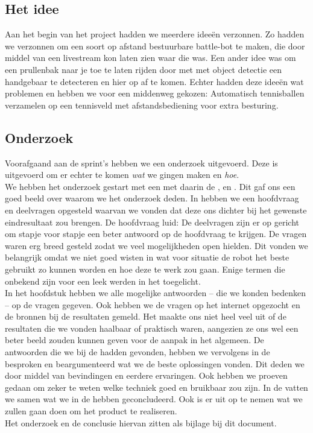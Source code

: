 \subsection{Het idee}
Aan het begin van het project hadden we meerdere ideeën verzonnen. Zo hadden we verzonnen om een soort op afstand bestuurbare battle-bot te maken, die door middel van een livestream kon laten zien waar die was. Een ander idee was om een prullenbak naar je toe te laten rijden door met met object detectie een handgebaar te detecteren en hier op af te komen. Echter hadden deze ideeën wat problemen en hebben we voor een middenweg gekozen: Automatisch tennisballen verzamelen op een tennisveld met afstandsbediening voor extra besturing.

\subsection{Onderzoek}
Voorafgaand aan de sprint's hebben we een onderzoek uitgevoerd. Deze is uitgevoerd om er echter te komen \textit{wat} we gingen maken en \textit{hoe}. \\

We hebben het onderzoek gestart met een  met daarin de ,  en . Dit gaf ons een goed beeld over waarom we het onderzoek deden. In  hebben we een hoofdvraag en deelvragen opgesteld waarvan we vonden dat deze ons dichter bij het gewenste eindresultaat zou brengen. De hoofdvraag luid: \textit{} De deelvragen zijn er op gericht om stapje voor stapje een beter antwoord op de hoofdvraag te krijgen. De vragen waren erg breed gesteld zodat we veel mogelijkheden open hielden. Dit vonden we belangrijk omdat we niet goed wisten in wat voor situatie de robot het beste gebruikt zo kunnen worden en hoe deze te werk zou gaan. Enige termen die onbekend zijn voor een leek werden in het  toegelicht.\\

In het hoofdstuk  hebben we alle mogelijke antwoorden  -- die we konden bedenken -- op de vragen gegeven. Ook hebben we de vragen op het internet opgezocht en de bronnen bij de resultaten gemeld. Het maakte ons niet heel veel uit of de resultaten die we vonden haalbaar of praktisch waren, aangezien ze ons wel een beter beeld zouden kunnen geven voor de aanpak in het algemeen. De antwoorden die we bij de  hadden gevonden, hebben we vervolgens in de  besproken en beargumenteerd wat we de beste oplossingen vonden. Dit deden we door middel van bevindingen en eerdere ervaringen. Ook hebben we proeven gedaan om zeker te weten welke techniek goed en bruikbaar zou zijn. In de  vatten we samen wat we in de  hebben geconcludeerd. Ook is er uit op te nemen wat we zullen gaan doen om het product te realiseren.\\

Het onderzoek en de conclusie hiervan zitten als bijlage bij dit document.\\

